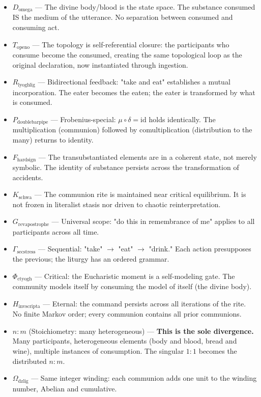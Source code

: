 \documentclass[12pt,a4paper]{article}
\begin{document}
\begin{itemize}
    \item \textbf{$D_{\text{omega}}$} --- The divine body/blood is the state space. The substance consumed IS the medium of the utterance. No separation between consumed and consuming act.
    \item \textbf{$T_{\text{openo}}$} --- The topology is self-referential closure: the participants who consume become the consumed, creating the same topological loop as the original declaration, now instantiated through ingestion.
    \item \textbf{$R_{\text{lyoghlig}}$} --- Bidirectional feedback: "take and eat" establishes a mutual incorporation. The eater becomes the eaten; the eater is transformed by what is consumed.
    \item \textbf{$P_{\text{doublebarpipe}}$} --- Frobenius-special: $\mu \circ \delta = \text{id}$ holds identically. The multiplication (communion) followed by comultiplication (distribution to the many) returns to identity.
    \item \textbf{$F_{\text{hardsign}}$} --- The transubstantiated elements are in a coherent state, not merely symbolic. The identity of substance persists across the transformation of accidents.
    \item \textbf{$K_{\text{schwa}}$} --- The communion rite is maintained near critical equilibrium. It is not frozen in literalist stasis nor driven to chaotic reinterpretation.
    \item \textbf{$G_{\text{revapostrophe}}$} --- Universal scope: "do this in remembrance of me" applies to all participants across all time.
    \item \textbf{$\Gamma_{\text{secstress}}$} --- Sequential: "take" $\rightarrow$ "eat" $\rightarrow$ "drink." Each action presupposes the previous; the liturgy has an ordered grammar.
    \item \textbf{$\Phi_{\text{ctyogh}}$} --- Critical: the Eucharistic moment is a self-modeling gate. The community models itself by consuming the model of itself (the divine body).
    \item \textbf{$H_{\text{invscripta}}$} --- Eternal: the command persists across all iterations of the rite. No finite Markov order; every communion contains all prior communions.
    \item \textbf{$n{:}m$} (Stoichiometry: many heterogeneous) --- \textbf{This is the sole divergence.} Many participants, heterogeneous elements (body and blood, bread and wine), multiple instances of consumption. The singular $1{:}1$ becomes the distributed $n{:}m$.
    \item \textbf{$\Omega_{\text{dzlig}}$} --- Same integer winding: each communion adds one unit to the winding number, Abelian and cumulative.
\end{itemize}
\end{document}
